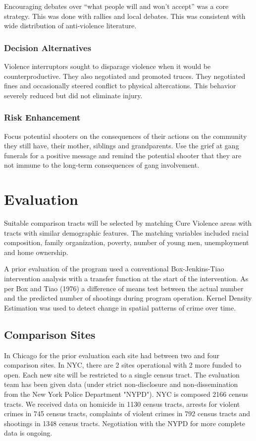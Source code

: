 \documentclass[11pt]{article}
\begin{document}
Encouraging debates over ``what people will and won't accept'' was a core strategy.  This was
done with rallies and local debates.  This was consistent with wide distribution of anti-violence
literature.
\subsubsection{Decision Alternatives}
\label{sec-1-5-2}

Violence interruptors sought to disparage violence when it would be counterproductive.  They also 
negotiated and promoted truces.  They negotiated fines and occasionally steered conflict to 
physical altercations.  This behavior severely reduced but did not eliminate injury.

\subsubsection{Risk Enhancement}
\label{sec-1-5-3}

Focus potential shooters on the consequences of their actions on the community they still have, 
their mother, siblings and grandparents.  Use the grief at gang funerals for a positive message and 
remind the potential shooter that they are not immune to the long-term consequences of gang
involvement.
\section{Evaluation}
\label{sec-2}

Suitable comparison tracts will be selected by matching Cure Violence
areas with tracts with similar demographic features. The matching
variables included racial composition, family organization, poverty,
number of young men, unemployment and home ownership.

A prior evaluation of the program used a conventional Box-Jenkins-Tiao
intervention analysis with a transfer function at the start of the
intervention.  As per Box and Tiao (1976) a difference of means test
between the actual number and the predicted number of shootings during
program operation.  Kernel Density Estimation was used to detect
change in spatial patterns of crime over time.

\subsection{Comparison Sites}
\label{sec-2-1}

In Chicago for the prior evaluation each site had between two and four
comparison sites. In NYC, there are 2 sites operational with 2 more
funded to open.  Each new site will be restricted to a single census
tract. The evaluation team has been given data (under strict
non-disclosure and non-dissemination from the New York Police
Department "NYPD").  NYC is composed 2166 census tracts.  We received
data on homicide in 1130 census tracts, arrests for violent crimes in
745 census tracts, complaints of violent crimes in 792 census tracts
and shootings in 1348 census tracts. Negotiation with the NYPD for
more complete data is ongoing.
\end{document}
